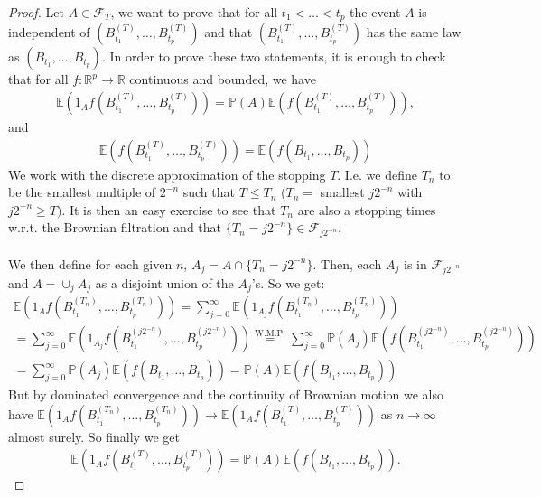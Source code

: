 \documentclass[../mainfile.tex]{subfiles}
\begin{document}
\newpage
\begin{proof}
Let $A \in \mathcal{F}_T$, we want to prove that for all $t_1 < \dots < t_p$ the event $A$ is independent of $(B_{t_1}^{(T)}, \dots , B_{t_p}^{(T)})$ and that $(B_{t_1}^{(T)}, \dots , B_{t_p}^{(T)})$ has the same law as $(B_{t_1}, \dots , B_{t_p})$. In order to prove these two statements, it is enough to check that for all $f: \mathbb{R}^p \to \mathbb{R}$ continuous and bounded, we have 
\begin{align*}
\mathbb{E}(1_A f(B_{t_1}^{(T)}, \dots , B_{t_p}^{(T)})) = \mathbb{P}(A) \mathbb{E}(f(B_{t_1}^{(T)}, \dots ,  B_{t_p}^{(T)})),
\end{align*}
and
\begin{align*}
\mathbb{E}(f(B_{t_1}^{(T)}, \dots , B_{t_p}^{(T)})) = \mathbb{E}(f(B_{t_1},  \dots , B_{t_p}))
\end{align*}
We work with the discrete approximation of the stopping $T$. I.e. we define $T_n$ to be the smallest multiple of $2^{-n}$ such that $T \leq T_n$ ($T_n=$ smallest $j2^{-n}$ with $j2^{-n} \geq T)$. It is then an easy exercise to see that $T_n$ are also a stopping times w.r.t. the Brownian filtration and that $\{T_n=j2^{-n}\} \in \mathcal{F}_{j2^{-n}}$. \\
\\
We then define for each given $n$, $A_j= A \cap \{T_n= j2^{-n}\}.$ Then, each $A_j$ is in $\mathcal{F}_{j2^{-n}}$ and $A= \cup_j A_j$ as a disjoint union of the $A_j$'s. So we get:
\begin{align*}
\mathbb{E}(1_A f(B_{t_1}^{(T_n)}, \dots , B_{t_p}^{(T_n)}))= \sum_{j=0}^\infty \mathbb{E}(1_{A_j} f(B_{t_1}^{(T_n)}, \dots , B_{t_p}^{(T_n)})) \\
= \sum_{j=0}^\infty \mathbb{E}(1_{A_j} f(B_{t_1}^{(j2^{-n})}, \dots , B_{t_p}^{(j2^{-n})})) \overset{\text{W.M.P.}}= \sum_{j=0}^\infty \mathbb{P}(A_j) \mathbb{E}(f(B_{t_1}^{(j2^{-n})}, \dots , B_{t_p}^{(j2^{-n})})) \\
= \sum_{j=0}^\infty \mathbb{P}(A_j) \mathbb{E}(f(B_{t_1}, \dots , B_{t_p})) = \mathbb{P}(A) \mathbb{E}(f(B_{t_1}, \dots , B_{t_p}))
\end{align*}
But by dominated convergence and the continuity of Brownian motion we also have $\mathbb{E}(1_A f(B_{t_1}^{(T_n)}, \dots , B_{t_p}^{(T_n)})) \to \mathbb{E}(1_A f(B_{t_1}^{(T)}, \dots , B_{t_p}^{(T)}))$ as $n \to \infty$ almost surely. So finally we get \begin{align*}
\mathbb{E}(1_A f(B_{t_1}^{(T)}, \dots , B_{t_p}^{(T)})) = \mathbb{P}(A) \mathbb{E}(f(B_{t_1}, \dots , B_{t_p})).
\end{align*}
\end{proof}
\end{document}
